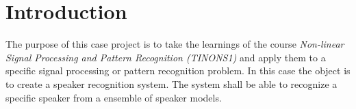 \section*{Introduction}
The purpose of this case project is to take the learnings of the course \emph{Non-linear Signal Processing and Pattern Recognition (TINONS1)} and apply them to a specific signal processing or pattern recognition problem.
In this case the object is to create a speaker recognition system.
The system shall be able to recognize a specific speaker from a ensemble of speaker models.
